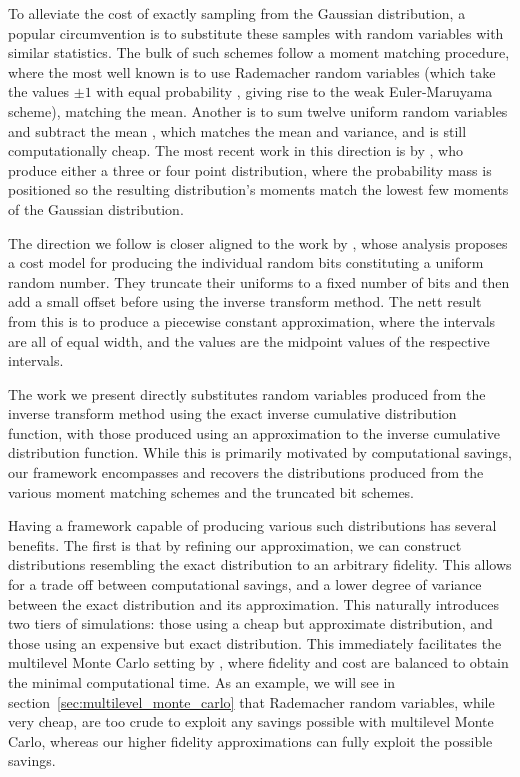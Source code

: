 \documentclass[manuscript,review]{acmart}
\begin{document}
To alleviate the cost of exactly sampling from the Gaussian distribution, a popular circumvention is to substitute these samples with random variables with similar statistics. The bulk of such schemes follow a moment matching procedure, where the most well known is to use Rademacher random variables (which take the values $ \pm 1 $ with equal probability \citep[page~XXXII]{kloeden1999numerical}, giving rise to the weak Euler-Maruyama scheme), matching the mean. Another is to sum twelve uniform random variables and subtract the mean \citep[page~500]{munk2011fixed}, which matches the mean and variance, and is still computationally cheap. The most recent work in this direction is by \citet{muller2015improving}, who produce either a three or four point distribution, where the probability mass is positioned so the resulting distribution's moments match the lowest few moments of the Gaussian distribution. 

The direction we follow is closer aligned to the work by \citet{giles2019random_quadrature,giles2019random_multilevel}, whose analysis proposes a cost model for producing the individual random bits constituting a uniform random number. They truncate their uniforms to a fixed number of bits and then add a small offset before using the inverse transform method. The nett result from this is to produce a piecewise constant approximation, where the intervals are all of equal width, and the values are the midpoint values of the respective intervals. 

The work we present directly substitutes random variables produced from the inverse transform method using the exact inverse cumulative distribution function, with those produced using an approximation to the inverse cumulative distribution function. While this is primarily motivated by computational savings, our framework encompasses and recovers the distributions produced from the various moment matching schemes and the truncated bit schemes. 

Having a framework capable of producing various such distributions has several benefits. The first is that by refining our approximation, we can construct distributions resembling the exact distribution to an arbitrary fidelity. This allows for a trade off between computational savings, and a lower degree of variance between the exact distribution and its approximation. This naturally  introduces two tiers of simulations: those using a cheap but approximate distribution, and those using an expensive but exact distribution. This immediately facilitates the multilevel Monte Carlo setting by \citet{giles2008multilevel}, where fidelity and cost are balanced to obtain the minimal computational time. As an example, we will see in section~\ref{sec:multilevel_monte_carlo} that Rademacher random variables, while very cheap, are too crude to exploit any savings possible with multilevel Monte Carlo, whereas our higher fidelity approximations can fully exploit the possible savings. 
\end{document}
